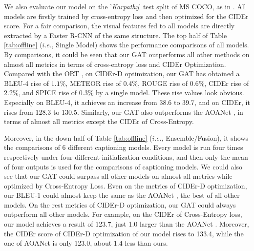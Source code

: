 \documentclass[review]{elsarticle}
\begin{document}
We also evaluate our model on the '\emph{Karpathy}' test split of MS COCO, as in \cite{karpathy2015deep}. All models are firstly trained by cross-entropy loss and then optimized for the CIDEr score. For a fair comparison, the visual features fed to all models are directly extracted by a Faster R-CNN of the same structure. The top half of Table \ref{tab:offline} ($i.e.$, Single Model) shows the performance comparisons of all models. By comparisons, it could be seen that our GAT outperforms all other methods on almost all metrics in terms of cross-entropy loss and CIDEr Optimization. Compared with the ORT \cite{herdade2019image}, on {CIDEr-D} optimization, our GAT has obtained a BLEU-4 rise of $1.1\%$, METEOR rise of 0.4\%, ROUGE rise of 0.6\%, CIDEr rise of 2.2\%, and SPICE rise of 0.3\% by a single model. These rise values look obvious. Especially on BLEU-4, it achieves an increase from 38.6 to 39.7, and on CIDEr, it rises from 128.3 to 130.5. Similarly, our GAT also outperforms the AOANet \cite{huang2019attention}, in terms of almost all metrics except the CIDEr of Cross-Entropy.

Moreover, in the down half of Table \ref{tab:offline} ($i.e.$, Ensemble/Fusion), it shows the comparisons of 6 different captioning models. Every model is run four times respectively under four different initialization conditions, and then only the mean of four outputs is used for the comparisons of captioning models. We could also see that our GAT could surpass all other models on almost all metrics while optimized by Cross-Entropy Loss. Even on the metrics of CIDEr-D optimization, our BLEU-1 could almost keep the same as the AOANet \cite{huang2019attention}, the best of all other models. On the rest metrics of CIDEr-D optimization, our GAT could always outperform all other models. For example, on the CIDEr of Cross-Entropy loss, our model achieves a result of 123.7, just 1.0 larger than the AOANet \cite{huang2019attention}. Moreover, the CIDEr score of CIDEr-D optimization of our model rises to 133.4, while the one of AOANet \cite{huang2019attention} is only 123.0, about 1.4 less than ours.
\end{document}
